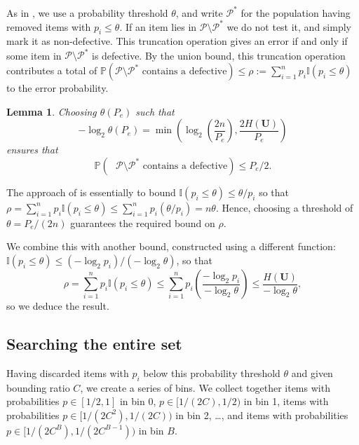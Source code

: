 \documentclass[conference]{IEEEtran}
\newtheorem{lemma}[theorem]{Lemma}
\newcommand{\vc}[1]{{\mathbf{ #1}}}
\newcommand{\II}{{\mathbb{I}}}
\newcommand{\pr}{{\mathbb{P}}}
\newcommand{\setP}{{\mathcal{P}}}
\begin{document}
As in \cite{li5}, we use a probability threshold $\theta$, and write $\setP^*$ for the population having removed items with $p_i \leq \theta$.
If an item lies in $\setP \setminus \setP^*$ we do not 
test it, and simply mark it as non-defective. This truncation operation gives an error if and only if some item in $\setP \setminus \setP^*$ is defective.
By the union bound, 
this truncation operation contributes a total of $\pr( \mbox{$\setP \setminus \setP^*$ contains a defective}) \leq  \rho := \sum_{i=1}^n p_i \II(p_i \leq \theta)$ to the error probability.



\begin{lemma} \label{lem:thresh}
Choosing $\theta(P_e)$ such that  
\begin{equation} \label{eq:thetadef}
-\log_2 \theta(P_e) = \min\left( \log_2  \left( \frac{2n}{P_e} \right), \frac{2 H( \vc{U})}{P_e} \right)
\end{equation}
ensures that  
\begin{equation}
\pr( \mbox{ $\setP \setminus \setP^*$ contains a defective} ) \leq P_e/2. \label{eq:setpstar} \end{equation} \end{lemma}
\begin{IEEEproof}
The approach of \cite{li5} is essentially to bound $\II(p_i \leq \theta) \leq \theta/p_i$ so that
$\rho = \sum_{i=1}^n p_i \II(p_i \leq \theta) \leq \sum_{i=1}^n p_i (\theta/p_i) = n \theta$. Hence, choosing a threshold
of $\theta = P_e/(2n)$ guarantees the required bound on $\rho$.

We combine this with another bound, constructed using a different function:
 $\II(p_i \leq \theta) \leq (-\log_2 p_i)/(-\log_2 \theta)$, so that
$$ \rho = \sum_{i=1}^n p_i \II(p_i \leq \theta) \leq \sum_{i=1}^n p_i  \left( 
\frac{-\log_2 p_i}{-\log_2 \theta } \right) \leq \frac{H( \vc{U})}{-\log_2 \theta},$$ 
so we deduce the result. \end{IEEEproof}

\subsection{Searching the entire set} 

Having discarded items with $p_i$ below
this probability threshold $\theta$ and given bounding ratio $C$,
we create a series of bins. We collect together items with probabilities $p \in [1/2,1]$ in bin 0,
$p \in [1/(2C), 1/2)$ in bin 1, items with probabilities $p \in [1/(2C^2), 1/(2C))$ in bin 2, \ldots, and items with probabilities $p \in 
[1/(2C^B), 1/(2C^{B-1}))$ in bin $B$.
\end{document}
